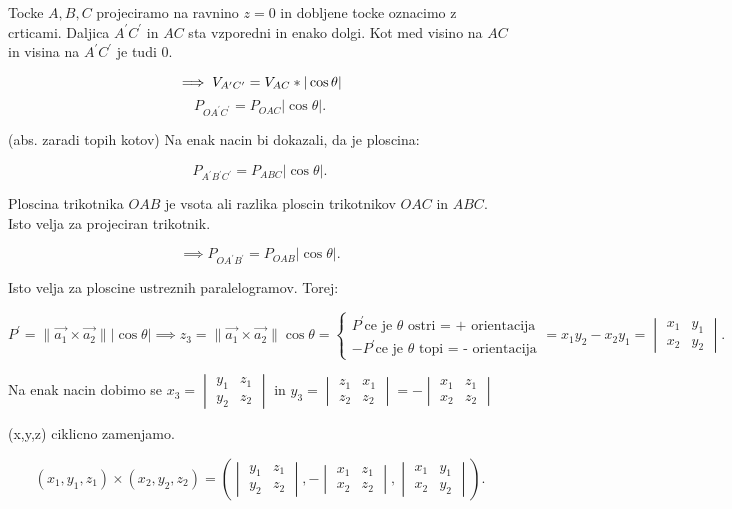 \documentclass{report}
\begin{document}
Tocke $A,B,C$ projeciramo na ravnino  $z=0$ in dobljene tocke oznacimo z crticami. Daljica  $A^{\prime}C^{\prime}$ in $AC$ sta vzporedni in enako dolgi. Kot med visino na  $AC$ in visina na  $A^{\prime}C^{\prime}$ je tudi 0.

\[
\implies V_{A^{\prime}C^{\prime}} = V_{AC} * |\cos \theta | \\
\]
\[
P_{OA^{\prime}C^{\prime}} = P_{OAC} |\cos \theta |
.\]

(abs. zaradi topih kotov)
Na enak nacin bi dokazali, da je ploscina:

\[
P_{A^{\prime}B^{\prime}C^{\prime}} = P_{ABC} | \cos \theta|
.\]

Ploscina trikotnika $OAB$ je vsota ali razlika ploscin trikotnikov $OAC$ in  $ABC$. Isto velja za projeciran trikotnik.

\[
	\implies P_{OA^{\prime}B^{\prime}} = P_{OAB} | \cos \theta |
.\]

Isto velja za ploscine ustreznih paralelogramov. Torej:

\[
P^{\prime} = \|\vec{a_1} \times \vec{a_2} \| | \cos \theta | \implies z_3 = \|\vec{a_1} \times \vec{a_2}\| \cos \theta = \begin{cases}
	P^{\prime} \text{ce je $\theta$ ostri = + orientacija}\\
	-P^{\prime}  \text{ce je $\theta$ topi = - orientacija}
\end{cases}
= x_1 y_2 - x_2 y_1 =
\begin{vmatrix}
	x_1 & y_1 \\
	x_2 & y_2

\end{vmatrix}
.\]

Na enak nacin dobimo se $x_3 =
\begin{vmatrix}
	y_1 & z_1 \\
	y_2 & z_2

\end{vmatrix}
$
in $y_3 =
\begin{vmatrix}
	z_1 & x_1 \\
	z_2 & z_2
\end{vmatrix}
= -
\begin{vmatrix}
	x_1 & z_1 \\
	x_2 & z_2
\end{vmatrix}
$


(x,y,z) ciklicno zamenjamo.


\[
	(x_1,y_1,z_1) \times (x_2,y_2,z_2) = \left(
	\begin{vmatrix}
		y_1 & z_1 \\
		y_2 & z_2
	\end{vmatrix}
	, -
	\begin{vmatrix}
		x_1 & z_1 \\
		x_2 & z_2
	\end{vmatrix}
	,
	\begin{vmatrix}
		x_1 & y_1 \\
		x_2 & y_2
	\end{vmatrix}
	\right)
.\]
\end{document}
